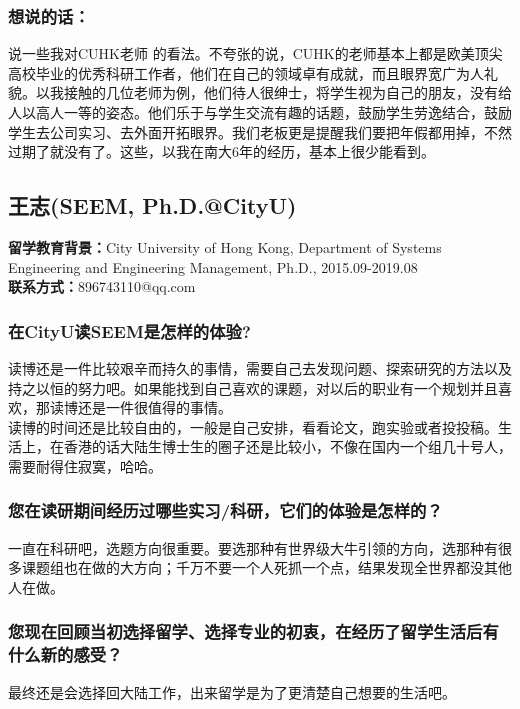 \documentclass[a4paper,UTF8]{book}
\begin{document}
    \subsubsection{想说的话：}
    说一些我对CUHK老师 的看法。不夸张的说，CUHK的老师基本上都是欧美顶尖高校毕业的优秀科研工作者，他们在自己的领域卓有成就，而且眼界宽广为人礼貌。以我接触的几位老师为例，他们待人很绅士，将学生视为自己的朋友，没有给人以高人一等的姿态。他们乐于与学生交流有趣的话题，鼓励学生劳逸结合，鼓励学生去公司实习、去外面开拓眼界。我们老板更是提醒我们要把年假都用掉，不然过期了就没有了。这些，以我在南大6年的经历，基本上很少能看到。



\clearpage
\subsection{王志(SEEM, Ph.D.@CityU)}
    \textbf{留学教育背景：}City University of Hong Kong, Department of Systems Engineering and Engineering Management, Ph.D., 2015.09-2019.08\\
    \textbf{联系方式：}896743110@qq.com

    \subsubsection*{在CityU读SEEM是怎样的体验?}
    读博还是一件比较艰辛而持久的事情，需要自己去发现问题、探索研究的方法以及持之以恒的努力吧。如果能找到自己喜欢的课题，对以后的职业有一个规划并且喜欢，那读博还是一件很值得的事情。\\
    读博的时间还是比较自由的，一般是自己安排，看看论文，跑实验或者投投稿。生活上，在香港的话大陆生博士生的圈子还是比较小，不像在国内一个组几十号人，需要耐得住寂寞，哈哈。
    
    \subsubsection*{您在读研期间经历过哪些实习/科研，它们的体验是怎样的？}
    一直在科研吧，选题方向很重要。要选那种有世界级大牛引领的方向，选那种有很多课题组也在做的大方向；千万不要一个人死抓一个点，结果发现全世界都没其他人在做。

    \subsubsection*{您现在回顾当初选择留学、选择专业的初衷，在经历了留学生活后有什么新的感受？}
    最终还是会选择回大陆工作，出来留学是为了更清楚自己想要的生活吧。
    
\end{document}

